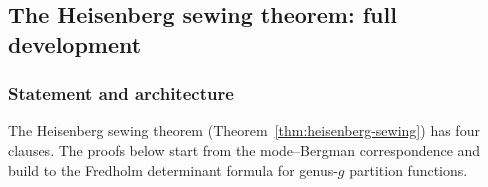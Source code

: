 %
%

\subsection{The Heisenberg sewing theorem: full development}

\subsubsection{Statement and architecture}

The Heisenberg sewing theorem
(Theorem~\ref{thm:heisenberg-sewing})
has four clauses. The proofs below start from the
mode--Bergman correspondence and build to the Fredholm
determinant formula for genus-$g$ partition functions.

